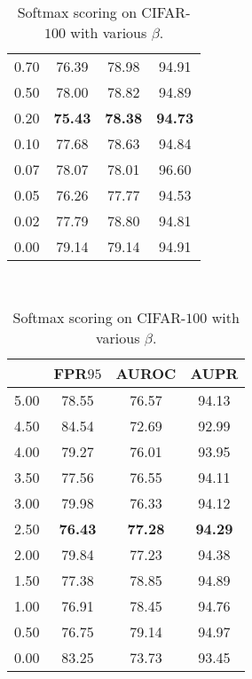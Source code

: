 \documentclass{article}
\begin{document}
\begin{table}[t]
{{\begin{tabular}{c|ccc}
0.70               & 76.39                  & 78.98                  & 94.91 \\
0.50               & 78.00                  & 78.82                  & 94.89 \\
\cellcolor{greyC}0.20               & \cellcolor{greyC}\textbf{75.43}                  & \cellcolor{greyC}\textbf{78.38}                  & \cellcolor{greyC}\textbf{94.73} \\
0.10               & 77.68                  & 78.63                  & 94.84 \\
0.07               & 78.07                  & 78.01                  & 96.60 \\
0.05               & 76.26                  & 77.77                  & 94.53 \\ 
0.02               & 77.79                  & 78.80                  & 94.81 \\
0.00               & 79.14                  & 79.14                  & 94.91 \\
\bottomrule[1.5pt]      
\end{tabular}
}
}~~
\parbox{.30\linewidth}{
\centering
\caption{Softmax scoring on CIFAR-$100$ with various  $\beta$.} \label{tab: ablation rho full se cifar100}
\scriptsize
\vspace{5pt}
{
\begin{tabular}{c|ccc}
\toprule[1.5pt]
          & FPR$95$     & AUROC       & AUPR     \\
\midrule[0.6pt]
5.00               & 78.55                  & 76.57                  & 94.13 \\
4.50               & 84.54                  & 72.69                  & 92.99 \\
4.00               & 79.27                  & 76.01                  & 93.95 \\
3.50               & 77.56                  & 76.55                  & 94.11 \\
3.00               & 79.98                  & 76.33                  & 94.12 \\
\cellcolor{greyC}2.50               & \cellcolor{greyC}\textbf{76.43}                  & \cellcolor{greyC}\textbf{77.28}                  & \cellcolor{greyC}\textbf{94.29} \\
2.00               & 79.84                  & 77.23                  & 94.38 \\
1.50               & 77.38                  & 78.85                  & 94.89 \\
1.00               & 76.91                  & 78.45                  & 94.76 \\
0.50               & 76.75                  & 79.14                  & 94.97 \\
0.00               & 83.25                  & 73.73                  & 93.45 \\
\bottomrule[1.5pt]      
\end{tabular}
}
}
\end{table}
\end{document}
